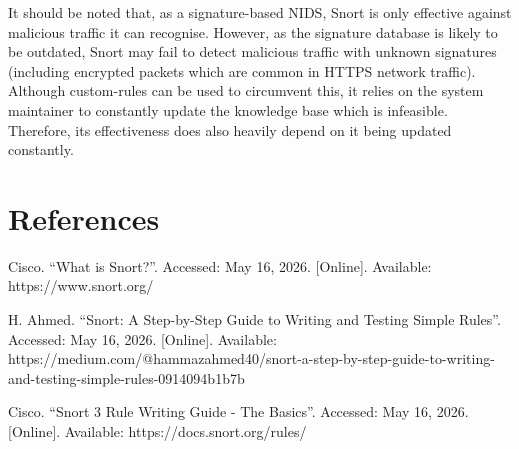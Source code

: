 It should be noted that, as a signature-based NIDS, Snort is only
effective against malicious traffic it can recognise. However, as the
signature database is likely to be outdated, Snort may fail to detect
malicious traffic with unknown signatures (including encrypted packets
which are common in HTTPS network traffic). Although custom-rules can be
used to circumvent this, it relies on the system maintainer to
constantly update the knowledge base which is infeasible. Therefore, its
effectiveness does also heavily depend on it being updated constantly.

\hypertarget{references}{%
\section{References}\label{references}}

Cisco. ``What is Snort?''. Accessed: May 16, 2026. {[}Online{]}.
Available: https://www.snort.org/

H. Ahmed. ``Snort: A Step-by-Step Guide to Writing and Testing Simple
Rules''. Accessed: May 16, 2026. {[}Online{]}. Available:
https://medium.com/@hammazahmed40/snort-a-step-by-step-guide-to-writing-and-testing-simple-rules-0914094b1b7b

Cisco. ``Snort 3 Rule Writing Guide - The Basics''. Accessed: May 16,
2026. {[}Online{]}. Available: https://docs.snort.org/rules/
